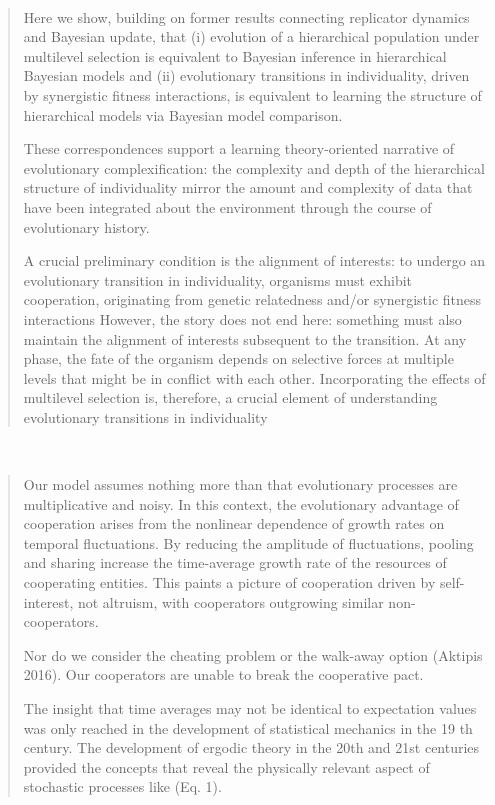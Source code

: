 \documentclass[a4paper,10pt]{article}
\begin{document}
\\

\begin{quotation} \cite{czegel2019-bayesianEvolution}

    Here we show, building on former results connecting replicator dynamics and Bayesian update, that (i) evolution of a hierarchical population under multilevel selection is equivalent to Bayesian inference in hierarchical Bayesian models and (ii) evolutionary transitions in individuality, driven by synergistic fitness interactions, is equivalent to learning the structure of hierarchical models via Bayesian model comparison.

    These correspondences support a learning theory-oriented narrative of evolutionary complexification: the complexity and depth of the hierarchical structure of individuality mirror the amount and complexity of data that have been integrated about the environment through the course of evolutionary history.
    
    A crucial preliminary condition is the alignment of interests: to undergo an evolutionary transition in individuality, organisms must exhibit cooperation, originating from genetic relatedness and/or synergistic fitness interactions
    However, the story does not end here: something must also maintain the alignment of interests subsequent to the transition.
    At any phase, the fate of the organism depends on selective forces at multiple levels that might be in conflict with each other.
    Incorporating the effects of multilevel selection is, therefore, a crucial element of understanding evolutionary transitions in individuality
    
    
\end{quotation}

\\

\begin{quotation} \cite{peters-cooperation2019.03.04}
    Our model assumes nothing more than that evolutionary processes are multiplicative and noisy.
    In this context, the evolutionary advantage of cooperation arises from the nonlinear dependence of growth rates on temporal fluctuations.
    By reducing the amplitude of fluctuations, pooling and sharing increase the time-average growth rate of the resources of cooperating entities.
    This paints a picture of cooperation driven by self-interest, not altruism, with cooperators outgrowing similar non-cooperators.
    
    Nor do we consider the cheating problem or the walk-away option (Aktipis 2016).
    Our cooperators are unable to break the cooperative pact.
    
    The insight that time averages may not be identical to expectation values was only reached in the development of statistical mechanics in the 19 th century.
    The development of ergodic theory in the 20th and 21st centuries provided the concepts that reveal the physically relevant aspect of stochastic processes like (Eq. 1).
\end{quotation}
\end{document}
